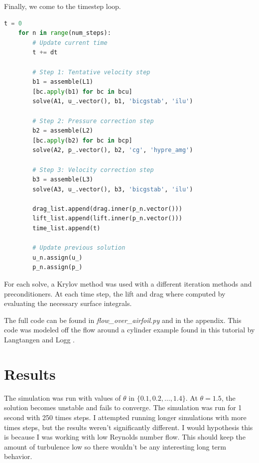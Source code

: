 \documentclass[12pt]{article}
\theoremstyle{definition}
\numberwithin{equation}{section}
\begin{document}
	Finally, we come to the timestep loop.
	\begin{lstlisting}[language=Python]
	t = 0
	for n in range(num_steps):
		# Update current time
		t += dt
		
		# Step 1: Tentative velocity step
		b1 = assemble(L1)
		[bc.apply(b1) for bc in bcu]
		solve(A1, u_.vector(), b1, 'bicgstab', 'ilu')
		
		# Step 2: Pressure correction step
		b2 = assemble(L2)
		[bc.apply(b2) for bc in bcp]
		solve(A2, p_.vector(), b2, 'cg', 'hypre_amg')
		
		# Step 3: Velocity correction step
		b3 = assemble(L3)
		solve(A3, u_.vector(), b3, 'bicgstab', 'ilu')
		
		drag_list.append(drag.inner(p_n.vector()))
		lift_list.append(lift.inner(p_n.vector()))
		time_list.append(t)
		
		# Update previous solution
		u_n.assign(u_)
		p_n.assign(p_)
	\end{lstlisting}
	
	For each solve, a Krylov method was used with a different iteration methods and preconditioners. At each time step, the lift and drag where computed by evaluating the necessary surface integrals.

	The full code can be found in \textit{flow\_over\_airfoil.py} and in the appendix. This code was modeled off the flow around a cylinder example found in this tutorial by Langtangen and Logg \cite{langtangen2016solving}.
	\section*{Results}
	The simulation was run with values of $\theta$ in $\{0.1,0.2,\ldots, 1.4\}$. At $\theta = 1.5$, the solution becomes unstable and fails to converge. The simulation was run for 1 second with 250 times steps. I attempted running longer simulations with more times steps, but the results weren't significantly different. I would hypothesis this is because I was working with low Reynolds number flow. This should keep the amount of turbulence low so there wouldn't be any interesting long term behavior.
	
\end{document}
